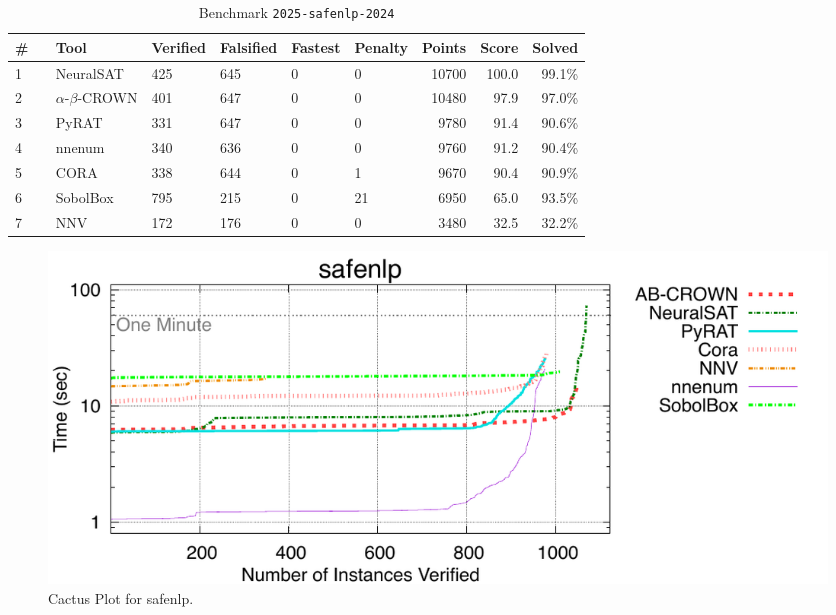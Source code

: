 \begin{table}[h]
\begin{center}
\caption{Benchmark \texttt{2025-safenlp-2024}} \label{tab:cat_2025_safenlp_2024}
{\setlength{\tabcolsep}{2pt}
\begin{tabular}[h]{@{}llllllrrr@{}}
\toprule
\textbf{\# ~} & \textbf{Tool} & \textbf{Verified} & \textbf{Falsified} & \textbf{Fastest} & \textbf{Penalty} & \textbf{Points} & \textbf{Score} & \textbf{Solved}\\
\midrule
1 & NeuralSAT & 425 & 645 & 0 & 0 & 10700 & 100.0 & 99.1\% \\
2 & $\alpha$-$\beta$-CROWN & 401 & 647 & 0 & 0 & 10480 & 97.9 & 97.0\% \\
3 & PyRAT & 331 & 647 & 0 & 0 & 9780 & 91.4 & 90.6\% \\
4 & nnenum & 340 & 636 & 0 & 0 & 9760 & 91.2 & 90.4\% \\
5 & CORA & 338 & 644 & 0 & 1 & 9670 & 90.4 & 90.9\% \\
6 & SobolBox & 795 & 215 & 0 & 21 & 6950 & 65.0 & 93.5\% \\
7 & NNV & 172 & 176 & 0 & 0 & 3480 & 32.5 & 32.2\% \\
\bottomrule
\end{tabular}
}
\end{center}
\end{table}



\begin{figure}[h]
\centerline{\includegraphics[width=\textwidth]{cactus/2025_safenlp_2024.pdf}}
\caption{Cactus Plot for safenlp.}
\label{fig:quantPic}
\end{figure}


\clearpage

